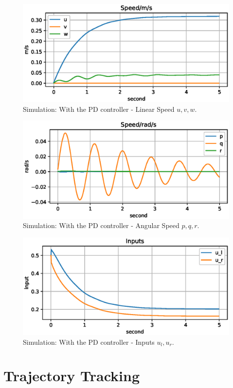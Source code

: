 \begin{figure}[H]
    \centering
    \includegraphics[width=.8\textwidth]{images/05pid-test-uvw.eps}
    \caption{Simulation: With the PD controller - Linear Speed $u, v, w$.}
    \label{fig:05pid-uvw}
\end{figure}

\begin{figure}[H]
    \centering
    \includegraphics[width=.8\textwidth]{images/05pid-test-pqr.eps}
    \caption{Simulation: With the PD controller - Angular Speed $p, q, r$.}
    \label{fig:05pid-pqr}
\end{figure}

\begin{figure}[H]
    \centering
    \includegraphics[width=.8\textwidth]{images/05pid-test-input.eps}
    \caption{Simulation: With the PD controller - Inputs $u_l, u_r$.}
    \label{fig:05pid-input}
\end{figure}

\section{Trajectory Tracking}

